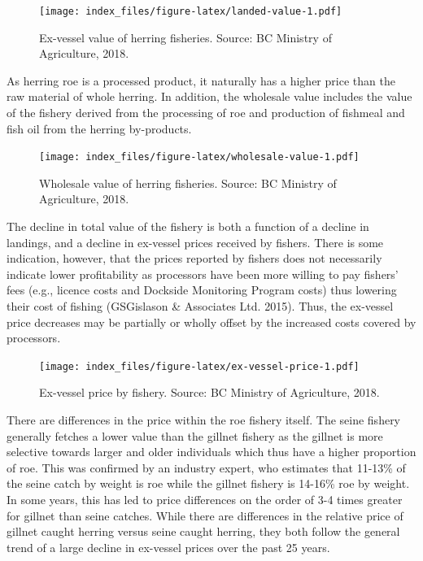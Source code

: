 \documentclass[]{article}
\theoremstyle{definition}
\theoremstyle{definition}
\theoremstyle{definition}
\theoremstyle{remark}
\begin{document}
\begin{figure}
\centering
\texttt{[image: index\_files/figure-latex/landed-value-1.pdf]}
\caption{\label{fig:landed-value}Ex-vessel value of herring fisheries.
Source: BC Ministry of Agriculture, 2018.}
\end{figure}

As herring roe is a processed product, it naturally has a higher price
than the raw material of whole herring. In addition, the wholesale value
includes the value of the fishery derived from the processing of roe and
production of fishmeal and fish oil from the herring by-products.

\begin{figure}
\centering
\texttt{[image: index\_files/figure-latex/wholesale-value-1.pdf]}
\caption{\label{fig:wholesale-value}Wholesale value of herring fisheries.
Source: BC Ministry of Agriculture, 2018.}
\end{figure}

The decline in total value of the fishery is both a function of a
decline in landings, and a decline in ex-vessel prices received by
fishers. There is some indication, however, that the prices reported by
fishers does not necessarily indicate lower profitability as processors
have been more willing to pay fishers' fees (e.g., licence costs and
Dockside Monitoring Program costs) thus lowering their cost of fishing
(GSGislason \& Associates Ltd. 2015). Thus, the ex-vessel price
decreases may be partially or wholly offset by the increased costs
covered by processors.

\begin{figure}
\centering
\texttt{[image: index\_files/figure-latex/ex-vessel-price-1.pdf]}
\caption{\label{fig:ex-vessel-price}Ex-vessel price by fishery. Source: BC
Ministry of Agriculture, 2018.}
\end{figure}

There are differences in the price within the roe fishery itself. The
seine fishery generally fetches a lower value than the gillnet fishery
as the gillnet is more selective towards larger and older individuals
which thus have a higher proportion of roe. This was confirmed by an
industry expert, who estimates that 11-13\% of the seine catch by weight
is roe while the gillnet fishery is 14-16\% roe by weight. In some
years, this has led to price differences on the order of 3-4 times
greater for gillnet than seine catches. While there are differences in
the relative price of gillnet caught herring versus seine caught
herring, they both follow the general trend of a large decline in
ex-vessel prices over the past 25 years.
\end{document}
